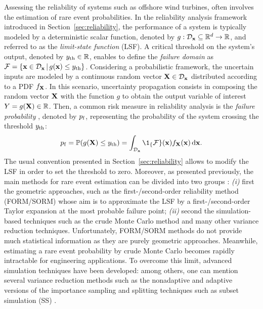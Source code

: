 Assessing the reliability of systems such as offshore wind turbines, often involves the estimation of rare event probabilities. 
In the reliability analysis framework introduced in Section~\ref{sec:reliability}, the performance of a system is typically modeled by a deterministic scalar function, denoted by $g: \mathcal{D}_{\bf x} \subseteq \mathbb{R}^d \rightarrow \mathbb{R}$, and referred to as the \textit{limit-state function} (LSF). 
A critical threshold on the system's output, denoted by $y_\mathrm{th} \in \mathbb{R}$, enables to define the \textit{failure domain} as $\mathcal{F} = \{{\bf x} \in \mathcal{D}_{\bf x} \, | \,  g({\bf x}) \leq y_\mathrm{th}\}$. 
Considering a probabilistic framework, the uncertain inputs are modeled by a continuous random vector ${\bf X} \in \mathcal{D}_{\bf x}$ distributed according to a PDF $f_{\bf X}$. 
In this scenario, uncertainty propagation consists in composing the random vector ${\bf X}$ with the function $g$ to obtain the output variable of interest $Y = g({\bf X}) \in \mathbb{R}$. 
Then, a common risk measure in reliability analysis is the \textit{failure probability} \citep{rockafellar_2015}, denoted by $p_\mathrm{f}$, representing the probability of the system crossing the threshold $y_\mathrm{th}$:
\begin{equation}
    \label{eq:failure_proba_c6}
    \pf = \P(g(\bX) \leq \yth)
        = \int_{\iD_\bx} \1_\{\iF\}(\bx) f_\bX(\bx) \, \dd\bx.
\end{equation}
The usual convention presented in Section~\ref{sec:reliability} allows to modify the LSF in order to set the threshold to zero. 
Moreover, as presented previously, the main methods for rare event estimation can be divided into two groups \citep{MorioBalesdent2015}: 
\textit{(i)} first the geometric approaches, such as the first-/second-order reliability method (FORM/SORM) whose aim is to approximate the LSF by a first-/second-order Taylor expansion at the most probable failure point; 
\textit{(ii)} second the simulation-based techniques such as the crude Monte Carlo method and many other variance reduction techniques. 
Unfortunately, FORM/SORM methods do not provide much statistical information as they are purely geometric approaches. 
Meanwhile, estimating a rare event probability by crude Monte Carlo becomes rapidly intractable for engineering applications. 
To overcome this limit, advanced simulation techniques have been developed: among others, one can mention several variance reduction methods such as the nonadaptive and adaptive versions of the importance sampling \citep{RubinsteinKroese1981} and splitting techniques \citep{cerou2012sequential} such as subset simulation (SS) \citep{AuBeck2001}.

